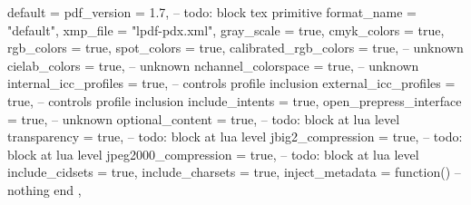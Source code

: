 %
default = {
        pdf_version             = 1.7,  -- todo: block tex primitive
        format_name             = "default",
        xmp_file                = "lpdf-pdx.xml",
        gray_scale              = true,
        cmyk_colors             = true,
        rgb_colors              = true,
        spot_colors             = true,
        calibrated_rgb_colors   = true, -- unknown
        cielab_colors           = true, -- unknown
        nchannel_colorspace     = true, -- unknown
        internal_icc_profiles   = true, -- controls profile inclusion
        external_icc_profiles   = true, -- controls profile inclusion
        include_intents         = true,
        open_prepress_interface = true, -- unknown
        optional_content        = true, -- todo: block at lua level
        transparency            = true, -- todo: block at lua level
        jbig2_compression       = true, -- todo: block at lua level
        jpeg2000_compression    = true, -- todo: block at lua level
        include_cidsets         = true,
        include_charsets        = true,
        inject_metadata         = function()
                                  -- nothing
                                  end
    },

